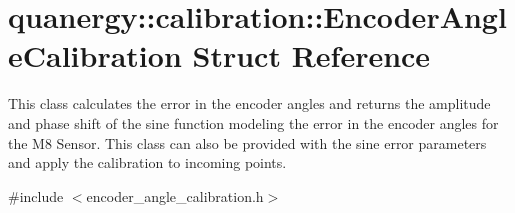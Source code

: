 \hypertarget{structquanergy_1_1calibration_1_1EncoderAngleCalibration}{\section{quanergy\-:\-:calibration\-:\-:Encoder\-Angle\-Calibration Struct Reference}
\label{structquanergy_1_1calibration_1_1EncoderAngleCalibration}
}


This class calculates the error in the encoder angles and returns the amplitude and phase shift of the sine function modeling the error in the encoder angles for the M8 Sensor. This class can also be provided with the sine error parameters and apply the calibration to incoming points.  




{\ttfamily \#include $<$encoder\-\_\-angle\-\_\-calibration.\-h$>$}

